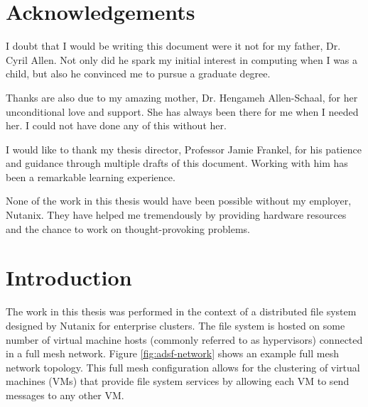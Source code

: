 \documentclass[12pt]{article}
\begin{document}
\section*{Acknowledgements}
\thispagestyle{empty}

I doubt that I would be writing this document were it not for my father, Dr.
Cyril Allen. Not only did he spark my initial interest in computing when I was
a child, but also he convinced me to pursue a graduate degree.

Thanks are also due to my amazing mother, Dr. Hengameh Allen-Schaal, for her
unconditional love and support. She has always been there for me when I needed
her. I could not have done any of this without her.

I would like to thank my thesis director, Professor Jamie Frankel, for
his patience and guidance through multiple drafts of this document. Working
with him has been a remarkable learning experience.

None of the work in this thesis would have been possible without my employer,
Nutanix. They have helped me tremendously by providing hardware resources and
the chance to work on thought-provoking problems.

\clearpage
\newpage


\tableofcontents
\newpage

\listoffigures
\newpage

\listoftables
\newpage


\newpage
\FloatBarrier
\section{Introduction}

  The work in this thesis was performed in the context of a distributed file
  system designed by Nutanix for enterprise clusters. The file system is hosted
  on some number of virtual machine hosts (commonly referred to as hypervisors)
  connected in a full mesh network. Figure \ref{fig:adsf-network} shows an
  example full mesh network topology. This full mesh configuration allows for
  the clustering of virtual machines (VMs) that provide file system services by
  allowing each VM to send messages to any other VM.
  
\end{document}
